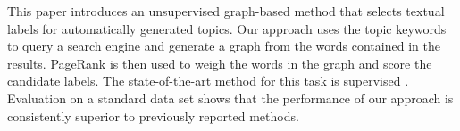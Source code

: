 This paper introduces an unsupervised graph-based method that selects textual labels for automatically generated topics. Our approach uses the topic keywords to query a search engine and generate a graph from the words contained in the results. PageRank is then used to weigh the words in the graph and score the candidate labels. The state-of-the-art method for this task is supervised \cite{Lau2011}. Evaluation on a standard data set shows that the performance of our approach is consistently superior to previously reported methods.
